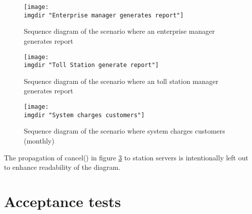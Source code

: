 \begin{figure}
  \texttt{[image: \\imgdir "Enterprise manager generates report"]}
  \caption{Sequence diagram of the scenario where an enterprise manager generates report}
  \label{fig:seq_diag:enterprise_manager_generate_report}
\end{figure}

\begin{figure}
  \texttt{[image: \\imgdir "Toll Station generate report"]}
  \caption{Sequence diagram of the scenario where an toll station manager generates report}
  \label{fig:seq_diag:enterprise_manager_generate_report}
\end{figure}

\begin{figure}
  \texttt{[image: \\imgdir "System charges customers"]}
  \caption{Sequence diagram of the scenario where system charges customers (monthly)}
  \label{fig:seq_diag:system_charges_customers}
\end{figure}
The propagation of cancel() in figure \ref{fig:seq_diag:system_charges_customers} to station servers is intentionally left out to enhance readability of the diagram.

\section{Acceptance tests}

